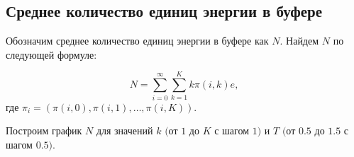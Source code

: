 \documentclass[12pt, a4paper]{article}
\begin{document}
\begin{figure}[h]
\end{figure}

\begin{flushleft}\subsection{Среднее количество единиц энергии в буфере}\end{flushleft}

Обозначим среднее количество единиц энергии в буфере как $N$. Найдем $N$ по следующей формуле:

$$N =\sum\limits_{i = 0}^{\infty} \sum\limits_{k = 1}^{K} k \pi(i, k)e,$$ где $\pi_i = (\pi(i, 0), \pi(i, 1), \ldots, \pi(i, K)).$

Построим график $N$ для значений $k$ $($от $1$ до $K$ с шагом $1)$ и  $T$ $($от $0.5$ до $1.5$  с шагом $0.5)$.
\end{document}
